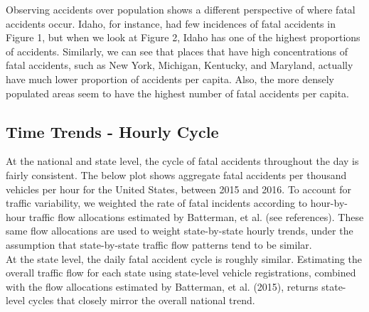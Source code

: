 \documentclass[11pt, oneside,titlepage]{article}   	%
\begin{document}
Observing accidents over population shows a different perspective of where fatal accidents occur. Idaho, for instance, had few incidences of fatal accidents in Figure 1, but when we look at Figure 2, Idaho has one of the highest proportions of accidents. Similarly, we can see that places that have high concentrations of fatal accidents, such as New York, Michigan, Kentucky, and Maryland, actually have much lower proportion of accidents per capita. Also, the more densely populated areas seem to have the highest number of fatal accidents per capita.

\subsection*{Time Trends - Hourly Cycle}
At the national and state level, the cycle of fatal accidents throughout the day is fairly consistent. The below plot shows aggregate fatal accidents per thousand vehicles per hour for the United States, between 2015 and 2016. To account for traffic variability, we weighted the rate of fatal incidents according to hour-by-hour traffic flow allocations estimated by Batterman, et al. (see references). These same flow allocations are used to weight state-by-state hourly trends, under the assumption that state-by-state traffic flow patterns tend to be similar. \\

At the state level, the daily fatal accident cycle is roughly similar. Estimating the overall traffic flow for each state using state-level vehicle registrations, combined with the flow allocations estimated by Batterman, et al. (2015), returns state-level cycles that closely mirror the overall national trend.
\end{document}
